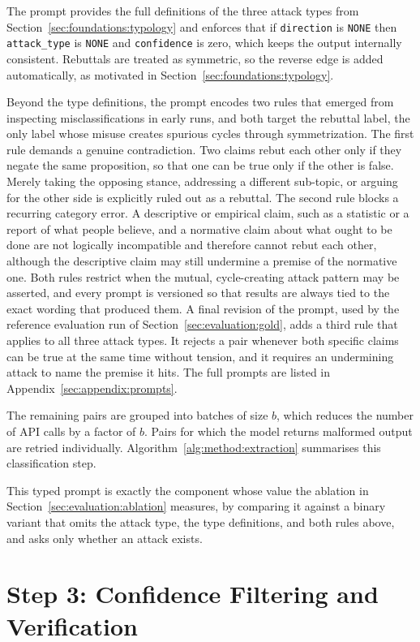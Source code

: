 The prompt provides the full definitions of the three attack types from
Section~\ref{sec:foundations:typology} and enforces that if
\texttt{direction} is \texttt{NONE} then \texttt{attack\_type} is \texttt{NONE}
and \texttt{confidence} is zero, which keeps the output internally consistent.
Rebuttals are treated as symmetric, so the reverse edge is added automatically,
as motivated in Section~\ref{sec:foundations:typology}.

Beyond the type definitions, the prompt encodes two rules that emerged from
inspecting misclassifications in early runs, and both target the rebuttal
label, the only label whose misuse creates spurious cycles through
symmetrization. The first rule demands a genuine contradiction. Two claims
rebut each other only if they negate the same proposition, so that one can be
true only if the other is false. Merely taking the opposing stance, addressing
a different sub-topic, or arguing for the other side is explicitly ruled out as
a rebuttal. The second rule blocks a recurring category error. A descriptive or
empirical claim, such as a statistic or a report of what people believe, and a
normative claim about what ought to be done are not logically incompatible and
therefore cannot rebut each other, although the descriptive claim may still
undermine a premise of the normative one. Both rules restrict when the mutual,
cycle-creating attack pattern may be asserted, and every prompt is versioned so
that results are always tied to the exact wording that produced them. A final
revision of the prompt, used by the reference evaluation run of
Section~\ref{sec:evaluation:gold}, adds a third rule that applies to all three
attack types. It rejects a pair whenever both specific claims can be true at
the same time without tension, and it requires an undermining attack to name
the premise it hits. The full
prompts are listed in Appendix~\ref{sec:appendix:prompts}.

The remaining
pairs are grouped into batches of size $b$, which reduces the number of API
calls by a factor of $b$. Pairs for which the
model returns malformed output are retried individually.
Algorithm~\ref{alg:method:extraction} summarises this classification step.

This typed prompt is exactly the component whose value the ablation in
Section~\ref{sec:evaluation:ablation} measures, by comparing it against a binary
variant that omits the attack type, the type definitions, and both rules above,
and asks only whether an attack exists.

\section{Step 3: Confidence Filtering and Verification}
\label{sec:method:filter}

